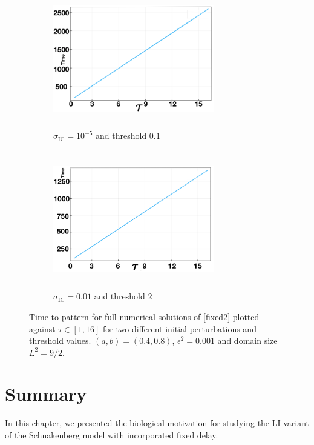 \begin{figure}[H]
    \centering
    \begin{subfigure}[b]{0.45\textwidth}
        \centering
        \includegraphics[width=7cm,height=6cm]{longlin3.png}
        \caption{$\sigma_{\text{IC}}=10^{-5}$ and threshold $0.1$}
        \label{fig:linperturb2a}
    \end{subfigure}
    \hfill
    \begin{subfigure}[b]{0.45\textwidth}
        \centering
        \includegraphics[width=7cm,height=6cm]{longlin4.png}
        \caption{$\sigma_{\text{IC}}=0.01$ and threshold $2$}
        \label{fig:linperturb2b}
    \end{subfigure}
    \caption{Time-to-pattern for full numerical solutions of \eqref{fixed2} plotted against $\tau\in[1,16]$ for two different initial perturbations and threshold values. $(a,b)=(0.4,0.8)$, $\epsilon^2=0.001$ and domain size $L^2=9/2$.}
    \label{fig:linperturb2}
\end{figure}


\section{Summary}

In this chapter, we presented the biological motivation for studying the LI variant of the Schnakenberg model with incorporated fixed delay.

